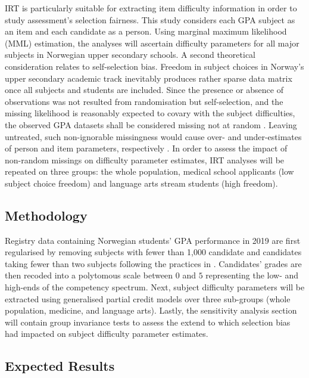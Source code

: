 IRT is particularly suitable for extracting item difficulty information in order to study assessment's selection fairness. This study considers each GPA subject as an item and each candidate as a person. Using marginal maximum likelihood (MML) estimation, the analyses will ascertain difficulty parameters for all major subjects in Norwegian upper secondary schools. A second theoretical consideration relates to self-selection bias. Freedom in subject choices in Norway's upper secondary academic track inevitably produces rather sparse data matrix once all subjects and students are included. Since the presence or absence of observations was not resulted from randomisation but self-selection, and the missing likelihood is reasonably expected to covary with the subject difficulties, the observed GPA datasets shall be considered missing not at random \parencite[MNAR,][]{rubin:1976}. Leaving untreated, such non-ignorable missingness would cause over- and under-estimates of person and item parameters, respectively \parencite{rose:2013}. In order to assess the impact of non-random missings on difficulty parameter estimates, IRT analyses will be repeated on three groups: the whole population, medical school applicants (low subject choice freedom) and language arts stream students (high freedom).

\subsection{Methodology}

Registry data containing Norwegian students' GPA performance in 2019 are first regularised by removing subjects with fewer than 1,000 candidate and candidates taking fewer than two subjects following the practices in \textcite{he:2018}. Candidates' grades are then recoded into a polytomous scale between $0$ and $5$ representing the low- and high-ends of the competency spectrum. Next, subject difficulty parameters will be extracted using generalised partial credit models \parencite[GPCM,][]{muraki:1992} over three sub-groups (whole population, medicine, and language arts). Lastly, the sensitivity analysis section will contain group invariance tests to assess the extend to which selection bias had impacted on subject difficulty parameter estimates.

\subsection{Expected Results}

